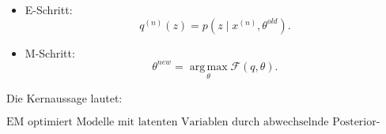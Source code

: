 \documentclass[11pt,a4paper]{scrartcl}
\begin{document}
\begin{answerbox}
\begin{itemize}
        \item E-Schritt:
        \[
            q^{(n)}(z)
            =
            p(z\mid x^{(n)},\theta^{old}).
        \]

        \item M-Schritt:
        \[
            \theta^{new}
            =
            \operatorname*{arg\,max}_{\theta}
            \mathcal{F}(q,\theta).
        \]
    \end{itemize}

    Die Kernaussage lautet:

    \[
        \boxed{
            \text{EM optimiert Modelle mit latenten Variablen durch
            abwechselnde Posterior-Berechnung und Parameteraktualisierung.}
        }
    \]
\end{answerbox}
\end{document}
